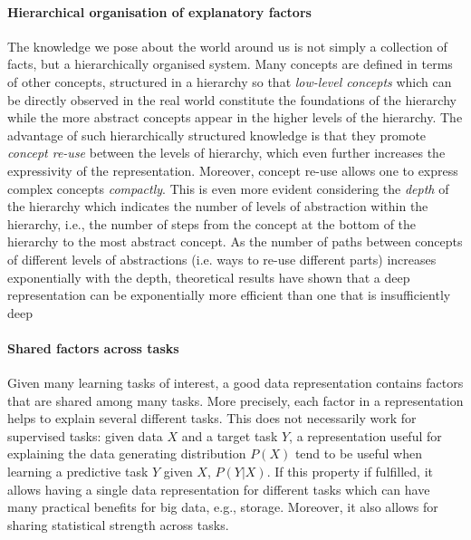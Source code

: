\paragraph{\textbf{Hierarchical organisation of explanatory factors}}
The knowledge we pose about the world around us is not simply a collection of facts, but a hierarchically organised system.
Many concepts are defined in terms of other concepts, structured in a hierarchy so that \textit{low-level concepts} which can be directly observed in the real world constitute the foundations of the hierarchy while the more abstract concepts appear in the higher levels of the hierarchy.
The advantage of such hierarchically structured knowledge is that they promote \textit{concept re-use} between the levels of hierarchy, which even further increases the expressivity of the representation.
Moreover, concept re-use allows one to express complex concepts \textit{compactly}.
This is even more evident considering the \textit{depth} of the hierarchy which indicates the number of levels of abstraction within the hierarchy, i.e., the number of steps from the concept at the bottom of the hierarchy to the most abstract concept.
As the number of paths between concepts of different levels of abstractions (i.e. ways to re-use different parts) increases exponentially with the depth, theoretical results have shown that a deep representation can be exponentially more efficient than one that is insufficiently deep \cite{Hastad:1986:AOL:12130.12132,89582,Bengio:2011:EPD:2050345.2050349}





\paragraph{\textbf{Shared factors across tasks}}
Given many learning tasks of interest, a good data representation contains factors that are shared among many tasks.
More precisely, each factor in a representation helps to explain several different tasks.
This does not necessarily work for supervised tasks: given data $X$ and a target task $Y$, a representation useful for explaining the data generating distribution $P(X)$ tend to be useful when learning a predictive task $Y$ given $X$, $P(Y|X)$.
If this property if fulfilled, it allows having a single data representation for different tasks which can have many practical benefits for big data, e.g., storage.
Moreover, it also allows for sharing statistical strength across tasks.





